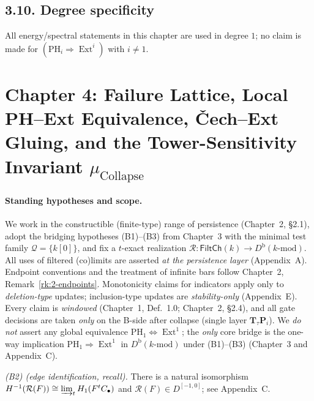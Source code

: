 \documentclass[11pt]{article}
\numberwithin{equation}{section}
\theoremstyle{plain}
\theoremstyle{definition}
\theoremstyle{remark}
\DeclareMathOperator{\Ext}{Ext}
\theoremstyle{plain}
\theoremstyle{definition}
\numberwithin{equation}{section}
\theoremstyle{definition}
\numberwithin{equation}{section}
\theoremstyle{plain}
\theoremstyle{definition}
\theoremstyle{remark}
\begin{document}
\subsection*{3.10. Degree specificity}
All energy/spectral statements in this chapter are used in degree \(1\); no claim is made for \((\mathrm{PH}_i \Rightarrow \Ext^i)\) with \(i\neq 1\).



\section{Chapter 4: Failure Lattice, Local PH–Ext Equivalence, Čech–Ext Gluing, and the Tower-Sensitivity Invariant \texorpdfstring{$\mu_{\mathrm{Collapse}}$}{mu\_Collapse}}

\paragraph{Standing hypotheses and scope.}
We work in the constructible (finite-type) range of persistence (Chapter~2, §2.1), adopt the bridging hypotheses \textup{(B1)–(B3)} from Chapter~3 with the minimal test family $\mathcal{Q}=\{k[0]\}$, and fix a $t$-exact realization $\mathcal{R}:\mathsf{FiltCh}(k)\to D^{\mathrm{b}}(k\text{-mod})$. All uses of filtered (co)limits are asserted \emph{at the persistence layer} (Appendix~A). Endpoint conventions and the treatment of infinite bars follow Chapter~2, Remark~\ref{rk:2-endpoints}. Monotonicity claims for indicators apply only to \emph{deletion-type} updates; inclusion-type updates are \emph{stability-only} (Appendix~E). Every claim is \emph{windowed} (Chapter~1, Def.~1.0; Chapter~2, §2.4), and all gate decisions are taken \emph{only} on the B-side after collapse (single layer $\mathbf{T}_\tau\mathbf{P}_i$). We \emph{do not} assert any global equivalence $\mathrm{PH}_1\Leftrightarrow \Ext^1$; the \emph{only} core bridge is the one-way implication $\mathrm{PH}_1\Rightarrow \Ext^1$ in $D^{\mathrm{b}}(k\text{-mod})$ under \textup{(B1)–(B3)} (Chapter~3 and Appendix~C).

\medskip
\noindent\emph{(B2) (edge identification, recall).}
There is a natural isomorphism $H^{-1}(\mathcal{R}(F))\cong \varinjlim_t H_1(F^tC_\bullet)$ and $\mathcal{R}(F)\in D^{[-1,0]}$; see Appendix~C.
\end{document}

